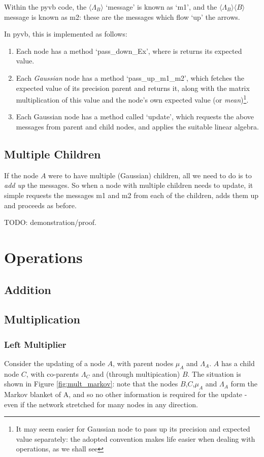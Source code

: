 \documentclass{article}
\newcommand{\<}{\langle}
\renewcommand{\>}{\rangle}
\begin{document}
Within the pyvb code, the $\<\Lambda_B\>$ `message' is known as `m1', and the $\<\Lambda_B\> \<B\>$ message is known as m2: these are the messages which flow `up' the arrows. 

In pyvb, this is implemented as follows:
\begin{enumerate}
\item Each node has a method `pass\_down\_Ex', where is returns its expected value. 
\item Each {\em Gaussian} node has a method `pass\_up\_m1_m2', which fetches the expected value of its precision parent and returns it, along with the matrix multiplication of this value and the node's own expected value (or {\em mean})\footnote{It may seem easier for Gaussian node to pass up its precision and expected value separately: the adopted convention makes life easier when dealing with operations, as we shall see}. 
\item Each Gaussian node has a method called `update', which requests the above messages from parent and child nodes, and applies the suitable linear algebra.
\end{enumerate}

\subsection{Multiple Children}
If the node $A$ were to have multiple (Gaussian) children, all we need to do is to {\em add up} the messages. So when a node with multiple children needs to update, it simple requests the messages m1 and m2 from each of the children, adds them up and proceeds as before.  

TODO: demonstration/proof.  



\section{Operations}
\subsection{Addition}
\subsection{Multiplication}
\subsubsection{Left Multiplier}
Consider the updating of a node $A$, with parent nodes $\mu_A$ and $\Lambda_A$.  $A$ has a child node $C$, with co-parents $\Lambda_C$ and (through multipication) $B$.  The situation is shown in Figure \ref{fig:mult_markov}:
note that the nodes $B$,$C$,$\mu_A$ and $\Lambda_A$ form the Markov blanket of A, and so no other information is required for the update - even if the network stretched for many nodes in any direction.  
\end{document}
